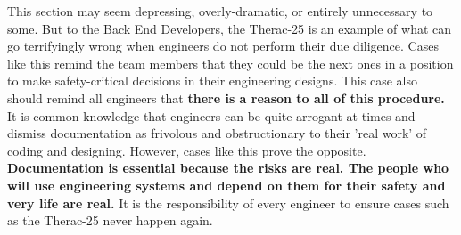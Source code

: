 \documentclass{article}
\begin{document}
This section may seem depressing, overly-dramatic, or entirely unnecessary to some. But to the Back End Developers, the Therac-25 is an example of what can go terrifyingly wrong when engineers do not perform their due diligence. Cases like this remind the team members that they could be the next ones in a position to make safety-critical decisions in their engineering designs. This case also should remind all engineers that \textbf{there is a reason to all of this procedure.} It is common knowledge that engineers can be quite arrogant at times and dismiss documentation as frivolous and obstructionary to their 'real work' of coding and designing. However, cases like this prove the opposite. \textbf{Documentation is essential because the risks are real. The people who will use engineering systems and depend on them for their safety and very life are real.} It is the responsibility of every engineer to ensure cases such as the Therac-25 never happen again.\\

\nocite{*}


\end{document}
